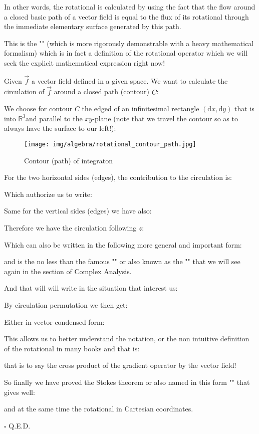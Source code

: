 	\begin{theorem}
	In other words, the rotational is calculated by using the fact that the flow around a closed basic path of a vector field is equal to the flux of its rotational through the immediate elementary surface generated by this path.

	This is the "" (which is more rigorously demonstrable with a heavy mathematical formalism) which is in fact a definition of the rotational operator which we will seek the explicit mathematical expression right now!
	\end{theorem}
	\begin{dem}
	Given $\vec{f}$ a vector field defined in a given space. We want to calculate the circulation of $\vec{f}$ around a closed path (contour) $C$:
	
	We choose for contour $C$ the edged of an infinitesimal rectangle $(\mathrm{d}x,\mathrm{d}y)$ that is into $\mathbb{R}^3$and parallel to the $xy$-plane (note that we travel the contour so as to always have the surface to our left!):
	\begin{figure}[H]
		\centering
		\texttt{[image: img/algebra/rotational\_contour\_path.jpg]}
		\caption[]{Contour (path) of integraton}
	\end{figure}
	For the two horizontal sides (edges), the contribution to the circulation is:
	
	Which authorize us to write:
	
	Same for the vertical sides  (edges) we have also:
	
	Therefore we have the circulation following $z$:
	
	Which can also be written in the following more general and important form:
	
	and is the no less than the famous "" or also known as the "" that we will see again in the section of Complex Analysis.
	
	And that will will write in the situation that interest us:
	
	By circulation permutation we then get:
	
	Either in vector condensed form:
	
	This allows us to better understand the notation, or the non intuitive definition of the rotational in many books and that is:
	
	that is to say the cross product of the gradient operator by the vector field!
	
	So finally we have proved the Stokes theorem or also named in this form "" that gives well:
	
	and at the same time the rotational in Cartesian coordinates.
	\begin{flushright}
		$\square$  Q.E.D.
	\end{flushright}
	\end{dem}
